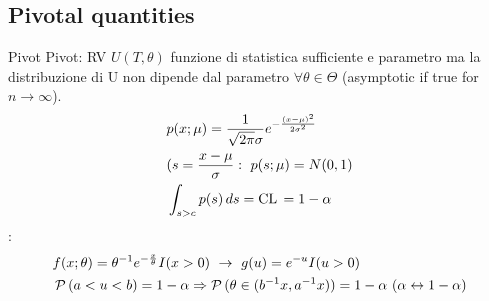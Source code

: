 \documentclass[asd-beamer.tex]{subfiles}
\begin{document}
\subsection{Pivotal quantities}

\begin{frame}{Pivot}
Pivot: RV $U(T,\theta)$ funzione di statistica sufficiente e parametro ma la distribuzione di U non dipende dal parametro $\forall \theta\in\Theta$ (asymptotic if true for $n\to\infty$).
\begin{align*}
&p(x;\mu)=\frac{1}{\sqrt{2\pi}\sigma}e^{-\frac{(x-\mu)^2}{2\sigma^2}}\\
&(s=\frac{x-\mu}{\sigma}:\ p(s;\mu)=N(0,1)\\
&\int_{s>c}p(s)\,ds=\operatorname{CL}{}=1-\alpha
\end{align*}
:
\begin{align*}
&f(x;\theta)=\invers{\theta}\exp{-\frac{x}{\theta}}I(x>0)\ \to\ g(u)=\exp{-u}I(u>0)\\
&\prob{(a<u<b)}=1-\alpha\Rightarrow\prob{(\theta\in(\invers{b}x,\invers{a}x))}=1-\alpha\ (\alpha\leftrightarrow1-\alpha)
%
\end{align*}
\end{frame}
\end{document}
